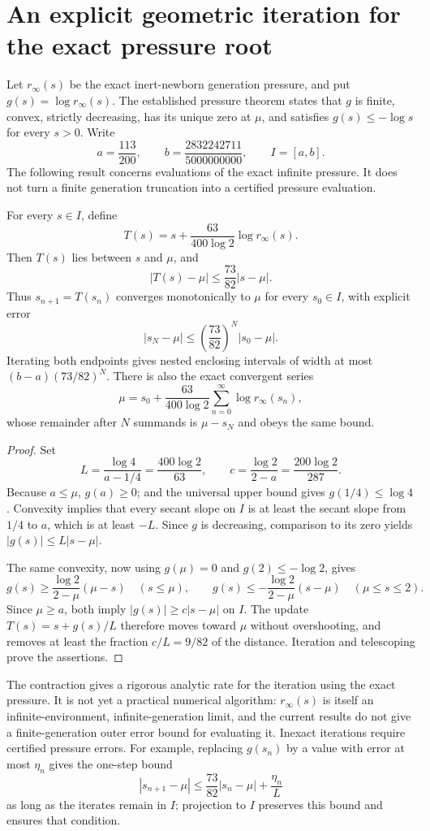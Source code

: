 \section{An explicit geometric iteration for the exact pressure root}
\label{pci:section}

Let $r_\infty(s)$ be the exact inert-newborn generation pressure, and put
$g(s)=\log r_\infty(s)$. The established pressure theorem states that
$g$ is finite, convex, strictly decreasing, has its unique zero at
$\mu$, and satisfies $g(s)\le-\log s$ for every $s>0$.
Write
\[
 a=\frac{113}{200},\qquad
 b=\frac{2832242711}{5000000000},\qquad I=[a,b].
\]
The following result concerns evaluations of the exact infinite pressure.
It does not turn a finite generation truncation into a certified pressure
evaluation.

\begin{theorem}
\label{pci:contraction}
For every $s\in I$, define
\[
 T(s)=s+\frac{63}{400\log2}\log r_\infty(s).
\]
Then $T(s)$ lies between $s$ and $\mu$, and
\[
 |T(s)-\mu|\le\frac{73}{82}|s-\mu|.
\]
Thus $s_{n+1}=T(s_n)$ converges monotonically to $\mu$ for every
$s_0\in I$, with explicit error
\[
 |s_N-\mu|\le\left(\frac{73}{82}\right)^N|s_0-\mu|.
\]
Iterating both endpoints gives nested enclosing intervals of width at
most $(b-a)(73/82)^N$. There is also the exact convergent series
\[
 \mu=s_0+\frac{63}{400\log2}
               \sum_{n=0}^\infty\log r_\infty(s_n),
\]
whose remainder after $N$ summands is $\mu-s_N$ and obeys the same bound.
\end{theorem}
\begin{proof}
Set
\[
 L=\frac{\log4}{a-1/4}=\frac{400\log2}{63},\qquad
 c=\frac{\log2}{2-a}=\frac{200\log2}{287}.
\]
Because $a\le\mu$, $g(a)\ge0$; and the universal upper bound gives
$g(1/4)\le\log4$. Convexity implies that every secant slope on $I$
is at least the secant slope from $1/4$ to $a$, which is at least
$-L$. Since $g$ is decreasing, comparison to its zero yields
$|g(s)|\le L|s-\mu|$.

The same convexity, now using $g(\mu)=0$ and $g(2)\le-\log2$, gives
\[
 g(s)\ge\frac{\log2}{2-\mu}(\mu-s)\quad(s\le\mu),
 \qquad
 g(s)\le-\frac{\log2}{2-\mu}(s-\mu)\quad(\mu\le s\le2).
\]
Since $\mu\ge a$, both imply $|g(s)|\ge c|s-\mu|$ on $I$.
The update $T(s)=s+g(s)/L$ therefore moves toward $\mu$ without
overshooting, and removes at least the fraction $c/L=9/82$ of the
distance. Iteration and telescoping prove the assertions.
\end{proof}

The contraction gives a rigorous analytic rate for the iteration using
the exact pressure. It is not yet a practical numerical algorithm:
$r_\infty(s)$ is itself an infinite-environment, infinite-generation
limit, and the current results do not give a finite-generation outer
error bound for evaluating it. Inexact iterations require certified
pressure errors. For example, replacing $g(s_n)$ by a value with error
at most $\eta_n$ gives the one-step bound
\[
 |s_{n+1}-\mu|\le\frac{73}{82}|s_n-\mu|+\frac{\eta_n}{L}
\]
as long as the iterates remain in $I$; projection to $I$ preserves this
bound and ensures that condition.
